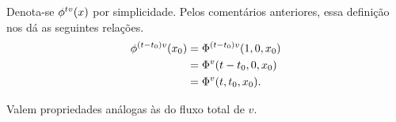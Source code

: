 Denota-se $\flux^{tv}(x)$ por simplicidade. Pelos comentários anteriores, essa definição nos dá as seguintes relações.
	\begin{align*}
	\flux^{(t-t_0)v}(x_0) &= \Flux[(t-t_0)v](1, 0, x_0) \\
		&= \Flux[v](t-t_0, 0, x_0) \\
		&= \Flux[v](t, t_0, x_0).
	\end{align*}

Valem propriedades análogas às do fluxo total de $v$.

\begin{comment}

\begin{proposition}
\label{prop:fluxo.campo.vetorial}
Sejam $\bm E$ um espaço normado completo, $A \subseteq E$ um aberto e $\fun{v}{A}{E}$ um campo vetorial localmente controlado.
	\begin{enumerate}
	\item Para todo $x \in A$, $(0, x) \in \dom(\flux^{v})$ e
		\begin{equation*}
		\flux^{0v}(x) = x;
		\end{equation*}
	\item Para todo $(t,x) \in \dom(\flux^{v})$ e todo $t' \in \R$ tal que $(t', \flux^{tv}(x)) \in \dom(\flux^{v})$, vale que $(t'+t, x) \in \dom(\flux^{v})$ e
		\begin{equation*}
		\flux^{(t'+t)v}(x) = \flux^{t'v} (\flux^{tv}(x));
		\end{equation*}
	\item Para todo $(t, x) \in \dom(\flux^{v})$, vale que $(-t, \flux^{tv}(x)) \in \dom(\flux^{v})$ e
		\begin{equation*}
		\flux^{-tv}(\flux^{tv}(x)) = x;
		\end{equation*}
	\item Para todo $x \in A$ e todos $t_0, t, t'_0, t' \in \R$ tais que $t-t_0 = t'-t'_0$, vale que $(t - t_0, x) \in \dom(\flux^{v})$ se, e somente se, $(t' - t'_0, x) \in \dom(\flux^{v})$; nesse caso,
		\begin{equation*}

\end{comment}
